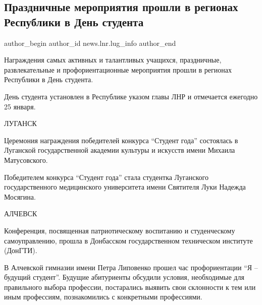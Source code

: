  
 
 
 
 
 
\subsection{Праздничные мероприятия прошли в регионах Республики в День студента}
\label{sec:25_01_2022.stz.news.lnr.lug_info.1.den_studenta}
 
\ifcmt
 author_begin
   author_id news.lnr.lug_info
 author_end
\fi

Награждения самых активных и талантливых учащихся, праздничные, развлекательные
и профориентационные мероприятия прошли в регионах Республики в День студента.

День студента установлен в Республике указом главы ЛНР и отмечается ежегодно 25
января.

ЛУГАНСК

Церемония награждения победителей конкурса \enquote{Студент года} состоялась в
Луганской государственной академии культуры и искусств имени Михаила
Матусовского. 


Победителем конкурса \enquote{Студент года} стала студентка Луганского государственного
медицинского университета имени Святителя Луки Надежда Мосягина.

АЛЧЕВСК

Конференция, посвященная патриотическому воспитанию и студенческому
самоуправлению, прошла в Донбасском государственном техническом институте
(ДонГТИ).


В Алчевской гимназии имени Петра Липовенко прошел час профориентации \enquote{Я –
будущий студент}. Будущие абитуриенты обсудили условия, необходимые для
правильного выбора профессии, постарались выявить свои склонности к тем или
иным профессиям, познакомились с конкретными профессиями.

